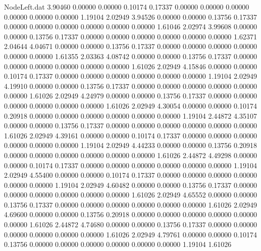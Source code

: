 \begin{filecontents}{NodeLeft.dat}
   3.90460    0.00000    0.00000     0.10174    0.17337    0.00000    0.00000    0.00000    0.00000    0.00000    0.00000    1.19104    2.02949
   3.94526    0.00000    0.00000     0.13756    0.17337    0.00000    0.00000    0.00000    0.00000    0.00000    0.00000    1.61046    2.02974
   3.99608    0.00000    0.00000     0.13756    0.17337    0.00000    0.00000    0.00000    0.00000    0.00000    0.00000    1.62371    2.04644
   4.04671    0.00000    0.00000     0.13756    0.17337    0.00000    0.00000    0.00000    0.00000    0.00000    0.00000    1.61355    2.03363
   4.08742    0.00000    0.00000     0.13756    0.17337    0.00000    0.00000    0.00000    0.00000    0.00000    0.00000    1.61026    2.02949
   4.15846    0.00000    0.00000     0.10174    0.17337    0.00000    0.00000    0.00000    0.00000    0.00000    0.00000    1.19104    2.02949
   4.19910    0.00000    0.00000     0.13756    0.17337    0.00000    0.00000    0.00000    0.00000    0.00000    0.00000    1.61026    2.02949
   4.24979    0.00000    0.00000     0.13756    0.17337    0.00000    0.00000    0.00000    0.00000    0.00000    0.00000    1.61026    2.02949
   4.30054    0.00000    0.00000     0.10174    0.20918    0.00000    0.00000    0.00000    0.00000    0.00000    0.00000    1.19104    2.44872
   4.35107    0.00000    0.00000     0.13756    0.17337    0.00000    0.00000    0.00000    0.00000    0.00000    0.00000    1.61026    2.02949
   4.39161    0.00000    0.00000     0.10174    0.17337    0.00000    0.00000    0.00000    0.00000    0.00000    0.00000    1.19104    2.02949
   4.44233    0.00000    0.00000     0.13756    0.20918    0.00000    0.00000    0.00000    0.00000    0.00000    0.00000    1.61026    2.44872
   4.49298    0.00000    0.00000     0.10174    0.17337    0.00000    0.00000    0.00000    0.00000    0.00000    0.00000    1.19104    2.02949
   4.55400    0.00000    0.00000     0.10174    0.17337    0.00000    0.00000    0.00000    0.00000    0.00000    0.00000    1.19104    2.02949
   4.60482    0.00000    0.00000     0.13756    0.17337    0.00000    0.00000    0.00000    0.00000    0.00000    0.00000    1.61026    2.02949
   4.65552    0.00000    0.00000     0.13756    0.17337    0.00000    0.00000    0.00000    0.00000    0.00000    0.00000    1.61026    2.02949
   4.69600    0.00000    0.00000     0.13756    0.20918    0.00000    0.00000    0.00000    0.00000    0.00000    0.00000    1.61026    2.44872
   4.74680    0.00000    0.00000     0.13756    0.17337    0.00000    0.00000    0.00000    0.00000    0.00000    0.00000    1.61026    2.02949
   4.79761    0.00000    0.00000     0.10174    0.13756    0.00000    0.00000    0.00000    0.00000    0.00000    0.00000    1.19104    1.61026

\end{filecontents}
